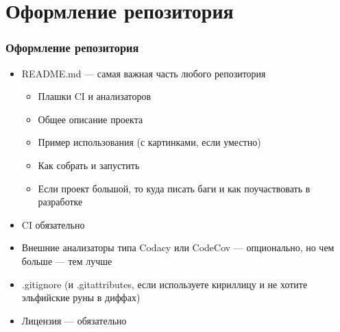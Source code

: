 \documentclass{../../slides-style}
\begin{document}
    \section{Оформление репозитория}

    \begin{frame}
        \frametitle{Оформление репозитория}
        \begin{itemize}
            \item README.md --- самая важная часть любого репозитория
            \begin{itemize}
                \item Плашки CI и анализаторов
                \item Общее описание проекта
                \item Пример использования (с картинками, если уместно)
                \item Как собрать и запустить
                \item Если проект большой, то куда писать баги и как поучаствовать в разработке
            \end{itemize}
            \item CI обязательно
            \item Внешние анализаторы типа Codacy или CodeCov --- опционально, но чем больше --- тем лучше
            \item .gitignore (и .gitattributes, если используете кириллицу и не хотите эльфийские руны в диффах)
            \item Лицензия --- обязательно
        \end{itemize}
    \end{frame}
\end{document}
